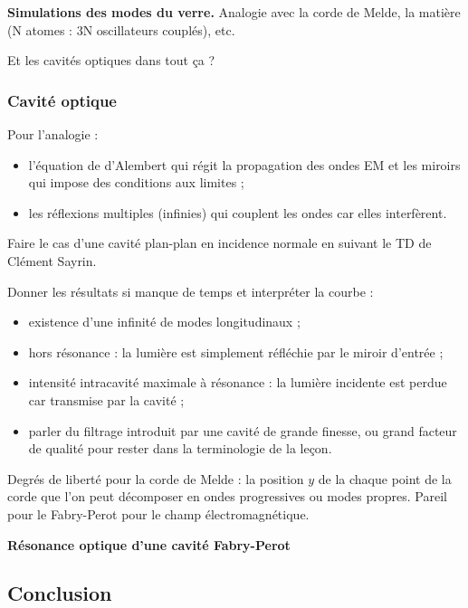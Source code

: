 \begin{slide}
\textbf{Simulations des modes du verre.}
Analogie avec la corde de Melde, la matière (N atomes : 3N oscillateurs couplés), etc.
\end{slide}

\begin{transition}
Et les cavités optiques dans tout ça ?
\end{transition}

\subsubsection{Cavité optique}

Pour l'analogie :
\begin{itemize}
\item l'équation de d'Alembert qui régit la propagation des ondes EM et les miroirs qui impose des conditions aux limites ;
\item les réflexions multiples (infinies) qui couplent les ondes car elles interfèrent.
\end{itemize}
Faire le cas d'une cavité plan-plan en incidence normale en suivant le TD de Clément Sayrin.

Donner les résultats si manque de temps et interpréter la courbe :
\begin{itemize}
\item existence d'une infinité de modes longitudinaux ;
\item hors résonance : la lumière est simplement réfléchie par le miroir d'entrée ;
\item intensité intracavité  maximale à résonance : la lumière incidente est perdue car transmise par la cavité ;
\item parler du filtrage introduit par une cavité de grande finesse, ou grand facteur de qualité pour rester dans la terminologie de la leçon.
\end{itemize}

\begin{remarque}
Degrés de liberté pour la corde de Melde : la position $y$ de la chaque point de la corde que l'on peut décomposer en ondes progressives ou modes propres.
Pareil pour le Fabry-Perot pour le champ électromagnétique.
\end{remarque}

\begin{slide}
\textbf{Résonance optique d'une cavité Fabry-Perot}
\end{slide}

\subsection*{Conclusion}


